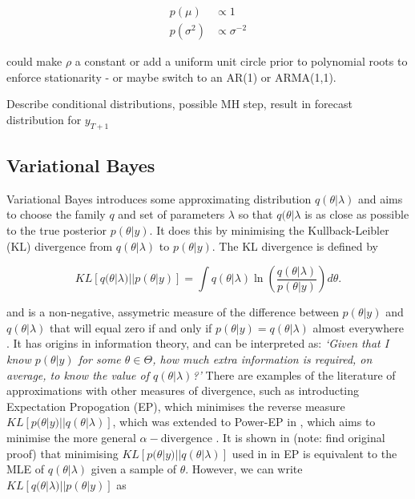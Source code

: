\documentclass{article}\usepackage[]{graphicx}\usepackage[]{color}
\numberwithin{equation}{section}
\begin{document}
\begin{align}
p(\mu) &\propto 1 \nonumber \\
p(\sigma^2) &\propto \sigma^{-2} \nonumber
\end{align}

could make $\rho$ a constant or add a uniform unit circle prior to polynomial roots to enforce stationarity - or maybe switch to an AR(1) or ARMA(1,1).

Describe conditional distributions, possible MH step, result in forecast distribution for $y_{T+1}$

\subsection{Variational Bayes}

Variational Bayes introduces some approximating distribution $q(\theta | \lambda)$ and aims to choose the family $q$ and set of parameters $\lambda$ so that $q(\theta | \lambda$ is as close as possible to the true posterior $p(\theta | y)$. It does this by minimising the Kullback-Leibler (KL) divergence \citep{Kullback1951} from $q(\theta | \lambda)$ to $p(\theta | y)$. The KL divergence is defined by

\begin{equation}
\label{KL-def}
KL[q(\theta | \lambda)||p(\theta | y)] = \int q(\theta | \lambda) \ln \left( \frac{q(\theta | \lambda)}{p(\theta | y)}\right) d\theta.
\end{equation}

and is a non-negative, assymetric measure of the difference between $p(\theta | y)$ and $q(\theta | \lambda)$ that will equal zero if and only if $p(\theta | y) = q(\theta | \lambda)$ almost everywhere \citep{Bishop2006}. It has origins in information theory, and can be interpreted as: \textit{`Given that I know $p(\theta | y)$ for some $\theta \in \Theta$, how much extra information is required, on average, to know the value of $q(\theta | \lambda)$?'} There are examples of the literature of approximations with other measures of divergence, such as \citet{Minka2001} introducting Expectation Propogation (EP), which minimises the reverse measure $KL[p(\theta | y)||q(\theta |\lambda)]$, which was extended to Power-EP in \citet{Minka2004}, which aims to minimise the more general $\alpha-\mbox{divergence}$ \citep{Amari1985}. It is shown in \citet{Bishop2006} (note: find original proof) that minimising $KL[p(\theta | y)||q(\theta | \lambda)]$ used in in EP is equivalent to the MLE of $q(\theta | \lambda)$ given a sample of $\theta$. However, we can write $KL[q(\theta | \lambda)||p(\theta | y)]$ as
\end{document}
